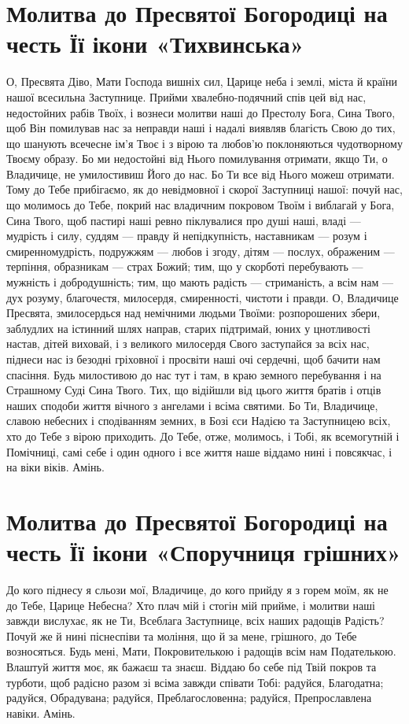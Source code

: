 \documentclass[chapters.tex]{subfiles}
\begin{document}
\section{Молитва до Пресвятої Богородиці на честь Її ікони «Тихвинська»}
О, Пресвята Діво, Мати Господа вишніх сил, Царице неба і землі, міста й країни нашої всесильна Заступнице. Прийми хвалебно-подячний спів цей від нас, недостойних рабів Твоїх, і вознеси молитви наші до Престолу Бога, Сина Твого, щоб Він помилував нас за неправди наші і надалі виявляв благість Свою до тих, що шанують всечесне ім’я Твоє і з вірою та любов’ю поклоняються чудотворному Твоєму образу. Бо ми недостойні від Нього помилування отримати, якщо Ти, о Владичице, не умилостивиш Його до нас. Бо Ти все від Нього можеш отримати. Тому до Тебе прибігаємо, як до невідмовної і скорої Заступниці нашої: почуй нас, що молимось до Тебе, покрий нас владичним покровом Твоїм і виблагай у Бога, Сина Твого, щоб пастирі наші ревно піклувалися про душі наші, владі — мудрість і силу, суддям — правду й непідкупність, наставникам — розум і смиренномудрість, подружжям — любов і згоду, дітям — послух, ображеним — терпіння, образникам — страх Божий; тим, що у скорботі перебувають — мужність і добродушність; тим, що мають радість — стриманість, а всім нам — дух розуму, благочестя, милосердя, смиренності, чистоти і правди. О, Владичице Пресвята, змилосердься над немічними людьми Твоїми: розпорошених збери, заблудлих на істинний шлях направ, старих підтримай, юних у цнотливості настав, дітей виховай, і з великого милосердя Свого заступайся за всіх нас, піднеси нас із безодні гріховної і просвіти наші очі сердечні, щоб бачити нам спасіння. Будь милостивою до нас тут і там, в краю земного перебування і на Страшному Суді Сина Твого. Тих, що відійшли від цього життя братів і отців наших сподоби життя вічного з ангелами і всіма святими. Бо Ти, Владичице, славою небесних і сподіванням земних, в Бозі єси Надією та Заступницею всіх, хто до Тебе з вірою приходить. До Тебе, отже, молимось, і Тобі, як всемогутній і Помічниці, самі себе і один одного і все життя наше віддамо нині і повсякчас, і на віки віків. Амінь.

\section{Молитва до Пресвятої Богородиці на честь Її ікони «Споручниця грішних»}
До кого піднесу я сльози мої, Владичице, до кого прийду я з горем моїм, як не до Тебе, Царице Небесна? Хто плач мій і стогін мій прийме, і молитви наші завжди вислухає, як не Ти, Всеблага Заступнице, всіх наших радощів Радість? Почуй же й нині піснеспіви та моління, що й за мене, грішного, до Тебе возносяться. Будь мені, Мати, Покровителькою і радощів всім нам Подателькою. Влаштуй життя моє, як бажаєш та знаєш. Віддаю бо себе під Твій покров та турботи, щоб радісно разом зі всіма завжди співати Тобі: радуйся, Благодатна; радуйся, Обрадувана; радуйся, Преблагословенна; радуйся, Препрославлена навіки. Амінь.
\end{document}
